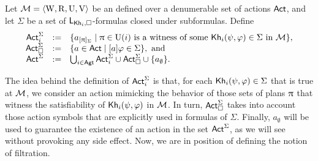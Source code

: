 \begin{definition}\label{def:filtration-actions}
Let $\mathcal{M} = \langle \operatorname{W},\operatorname{R},\operatorname{U},\operatorname{V} \rangle$ be an \ults defined over a denumerable set of actions ${\rm \sf Act}$, and let $\Sigma$ be a set of $\mathsf{L}_{{\sf Kh}_i,\square}$-formulas closed under subformulas.
Define
$$
\begin{array}{rcl}
{\rm \sf Act}^{\Sigma}_i & := & \{ a_{[\uppi]_\Sigma} \mid \uppi \in \operatorname{U}(i) \text{ is a witness of some } {\sf Kh}_i(\psi,\varphi) \in \Sigma \text{ in } \mathcal{M} \},\\
{\rm \sf Act}^\Sigma_{\square} & := & \{ a \in {\rm \sf Act} \mid [a]\varphi \in \Sigma \}, \text{ and }\\
{\rm \sf Act}^\Sigma & := & \bigcup_{i \in {\rm \sf Agt}} {\rm \sf Act}^\Sigma_i \cup {\rm \sf Act}^\Sigma_{\square}\cup \{ a_\emptyset \}.
\end{array}
$$
\end{definition}

The idea behind the definition of ${\rm \sf Act}^{\Sigma}_i$ is that, for each ${\sf Kh}_i(\psi,\varphi) \in \Sigma$ that is true at $\mathcal{M}$, we consider an action mimicking the behavior of those sets of plans $\uppi$ that witness the satisfiability of ${\sf Kh}_i(\psi,\varphi)$ in $\mathcal{M}$. In turn, ${\rm \sf Act}^\Sigma_{\square}$ takes into account those action symbols that are explicitly used in formulas of $\Sigma$. Finally, $a_\emptyset$ will be used to guarantee the existence of an action in the set ${\rm \sf Act}^\Sigma$, as we will see without provoking any side effect. 
Now, we are in position of defining the notion of filtration. 

\medskip

